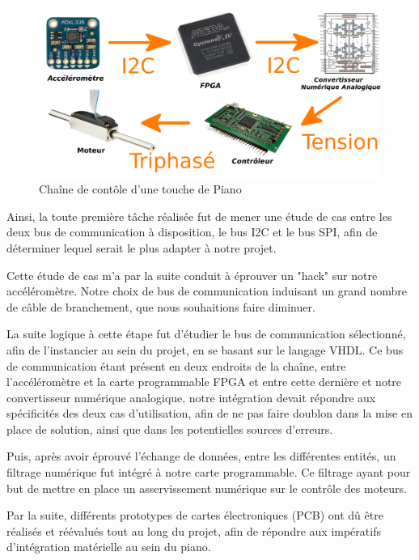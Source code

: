 \documentclass[french,a4paper,12pt]{report}
\begin{document}
	\begin{figure}[!ht]
    \center
  	\includegraphics[width=17cm]{CH.png}
    \caption{Chaîne de contôle d'une touche de Piano}
	\end{figure}	
	
	Ainsi, la toute première tâche réalisée fut de mener une étude de cas entre les deux bus de communication à disposition, le bus I2C et le bus SPI, afin de déterminer lequel serait le plus adapter à notre projet.
	
	Cette étude de cas m'a par la suite conduit à éprouver un "hack" sur notre accéléromètre. Notre choix de bus de communication induisant un grand nombre de câble de branchement, que nous souhaitions faire diminuer.
	
	La suite logique à cette étape fut d'étudier le bus de communication sélectionné, afin de l'instancier au sein du projet, en se basant sur le langage VHDL. Ce bus de communication étant présent en deux endroits de la chaîne, entre l'accéléromètre et la carte programmable FPGA et entre cette dernière et notre convertisseur numérique analogique, notre intégration devait répondre aux spécificités des deux cas d'utilisation, afin de ne pas faire doublon dans la mise en place de solution, ainsi que dans les potentielles sources d'erreurs.
	
	Puis, après avoir éprouvé l'échange de données, entre les différentes entités, un filtrage numérique fut intégré à notre carte programmable. Ce filtrage ayant pour but de mettre en place un asservissement numérique sur le contrôle des moteurs.

	Par la suite, différents prototypes de cartes électroniques (PCB) ont dû être réalisés et réévalués tout au long du projet, afin de répondre aux impératifs d'intégration matérielle au sein du piano.
	
\end{document}
